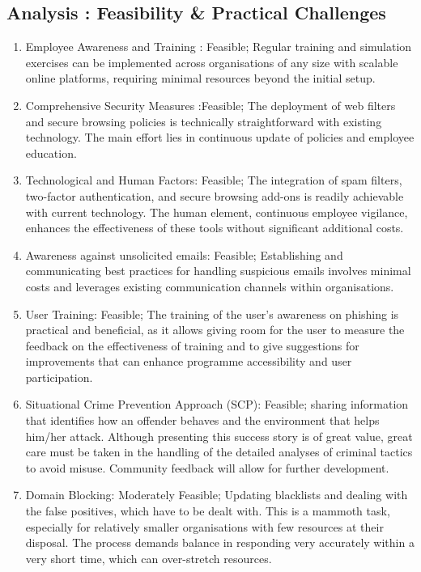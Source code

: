 \subsection{ Analysis : Feasibility \& Practical Challenges }

\begin{enumerate}
    \item Employee Awareness and Training : Feasible; Regular training and simulation exercises can be implemented across organisations of any size with scalable online platforms, requiring minimal resources beyond the initial setup.
    \item Comprehensive Security Measures :Feasible; The deployment of web filters and secure browsing policies is technically straightforward with existing technology. The main effort lies in continuous update of policies and employee education.
    \item Technological and Human Factors: Feasible; The integration of spam filters, two-factor authentication, and secure browsing add-ons is readily achievable with current technology. The human element, continuous employee vigilance, enhances the effectiveness of these tools without significant additional costs.
    \item Awareness against unsolicited emails: Feasible; Establishing and communicating best practices for handling suspicious emails involves minimal costs and leverages existing communication channels within organisations.

     \item User Training: Feasible; The training of the user's awareness on phishing is practical and beneficial, as it allows giving room for the user to measure the feedback on the effectiveness of training and to give suggestions for improvements that can enhance programme accessibility and user participation.
     
     \item Situational Crime Prevention Approach (SCP): Feasible; sharing information that identifies how an offender behaves and the environment that helps him/her attack. Although presenting this success story is of great value, great care must be taken in the handling of the detailed analyses of criminal tactics to avoid misuse. Community feedback will allow for further development.
     
     \item Domain Blocking: Moderately Feasible; Updating blacklists and dealing with the false positives, which have to be dealt with. This is a mammoth task, especially for relatively smaller organisations with few resources at their disposal. The process demands balance in responding very accurately within a very short time, which can over-stretch resources.
     

\end{enumerate}

